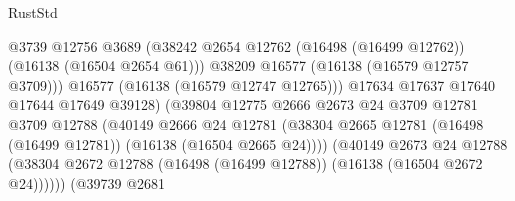 \begin{lexlean}{RustStd}
\begin{coremodule}
                                              @3739
                                              @12756
                                              @3689
                                              (@38242
                                                @2654
                                                @12762
                                                (@16498 (@16499 @12762))
                                                (@16138 (@16504 @2654 @61)))
                                              @38209
                                              @16577
                                              (@16138 (@16579 @12757 @3709)))
                                            @16577
                                            (@16138 (@16579 @12747 @12765)))
                                          @17634
                                          @17637
                                          @17640
                                          @17644
                                          @17649
                                          @39128)
                                        (@39804
                                          @12775
                                          @2666
                                          @2673
                                          @24
                                          @3709
                                          @12781
                                          @3709
                                          @12788
                                          (@40149
                                            @2666
                                            @24
                                            @12781
                                            (@38304
                                              @2665
                                              @12781
                                              (@16498 (@16499 @12781))
                                              (@16138 (@16504 @2665 @24))))
                                          (@40149
                                            @2673
                                            @24
                                            @12788
                                            (@38304
                                              @2672
                                              @12788
                                              (@16498 (@16499 @12788))
                                              (@16138 (@16504 @2672 @24))))))
                                      (@39739
                                        @2681

\end{coremodule}
\end{lexlean}
